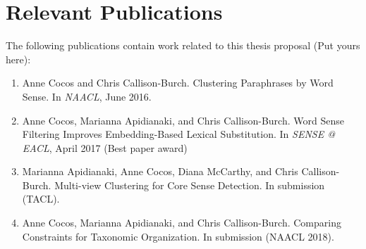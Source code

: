 \documentclass{article}
\begin{document}
\section*{Relevant Publications}

The following publications contain work related to this thesis proposal {\color{red} (Put yours here)}:

\begin{enumerate}

\item Anne Cocos and Chris Callison-Burch. Clustering Paraphrases by Word Sense. In \textit{NAACL}, June 2016.

\item Anne Cocos, Marianna Apidianaki, and Chris Callison-Burch. Word Sense Filtering Improves Embedding-Based Lexical Substitution. In \textit{SENSE @ EACL}, April 2017 (Best paper award)

\item Marianna Apidianaki, Anne Cocos, Diana McCarthy, and Chris Callison-Burch. Multi-view Clustering for Core Sense Detection. In submission (TACL).

\item Anne Cocos, Marianna Apidianaki, and Chris Callison-Burch. Comparing Constraints for Taxonomic Organization. In submission (NAACL 2018).

\end{enumerate}

\end{document}
